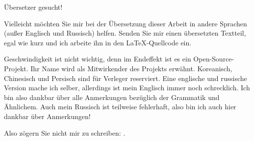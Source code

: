 \vspace*{\fill}

\Huge Übersetzer gesucht!

\normalsize

\bigskip
\bigskip
\bigskip

Vielleicht möchten Sie mir bei der Übersetzung dieser Arbeit in andere Sprachen (außer Englisch und
Russisch) helfen. Senden Sie mir einen übersetzten Textteil, egal wie kurz und ich arbeite ihn in den
\LaTeX{}-Quellcode ein.

\iffalse
Für diejenigen die keine Angst vor \TeX{} haben: \href{https://github.com/dennis714/RE-for-beginners/blob/master/Translation.md}{hier lesen}.
Für diejenigen die Zweigel haben, öffnen Sie die PDF-Datei einfach in OpenOffice und überarbeiten Sie den Text Satzweise.
Ich werde den Text dann in den \LaTeX{}-Code zurückkopieren.
Es gibt noch einen besseren Weg: meiner Erfahrung nach, you can gain your motivation by translating short pieces of my book and posting them to your blog(s).
Ich kann die URL zu diesen Posts über meinen Twitter-Account posten: (\href{http://twitter.com/yurichev}{@yurichev}).
\fi

Geschwindigkeit ist nicht wichtig, denn im Endeffekt ist es ein Open-Source-Projekt.
Ihr Name wird als Mitwirkender des Projekts erwähnt.
Koreanisch, Chinesisch und Persisch sind für Verleger reserviert.
Eine englische und russische Version mache ich selber, allerdings ist mein Englisch immer noch schrecklich.
Ich bin also dankbar über alle Anmerkungen bezüglich der Grammatik und Ähnlichem.
Auch mein Russisch ist teilweise fehlerhaft, also bin ich auch hier dankbar über Anmerkungen!%

Also zögern Sie nicht mir zu schreiben: \GTT{\EMAIL}.

\vspace*{\fill}
\vfill
